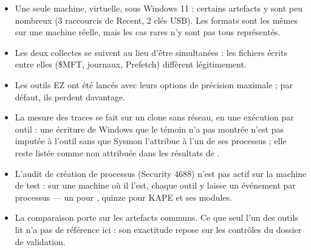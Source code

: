 \documentclass[11pt,a4paper,oneside]{report}
\begin{document}
\begin{itemize}
  \item Une seule machine, virtuelle, sous Windows 11 : certains artefacts y
        sont peu nombreux (3 raccourcis de Recent, 2 clés USB). Les formats sont
        les mêmes sur une machine réelle, mais les cas rares n'y sont pas tous
        représentés.
  \item Les deux collectes se suivent au lieu d'être simultanées : les fichiers
        écrits entre elles (\$MFT, journaux, Prefetch) diffèrent légitimement.
  \item Les outils EZ ont été lancés avec leurs options de précision maximale ;
        par défaut, ils perdent davantage.
  \item La mesure des traces se fait sur un clone sans réseau, en une
        exécution par outil : une écriture de Windows que le témoin n'a pas
        montrée n'est pas imputée à l'outil sans que Sysmon l'attribue à l'un de
        ses processus ; elle reste listée comme non attribuée dans les résultats
        de .
  \item L'audit de création de processus (Security 4688) n'est pas actif sur la
        machine de test : sur une machine où il l'est, chaque outil y laisse un
        événement par processus --- un pour \wac{}, quinze pour KAPE et ses
        modules.
  \item La comparaison porte sur les artefacts communs. Ce que seul l'un des
        outils lit n'a pas de référence ici : son exactitude repose sur les
        contrôles du dossier de validation.
\end{itemize}
\end{document}
